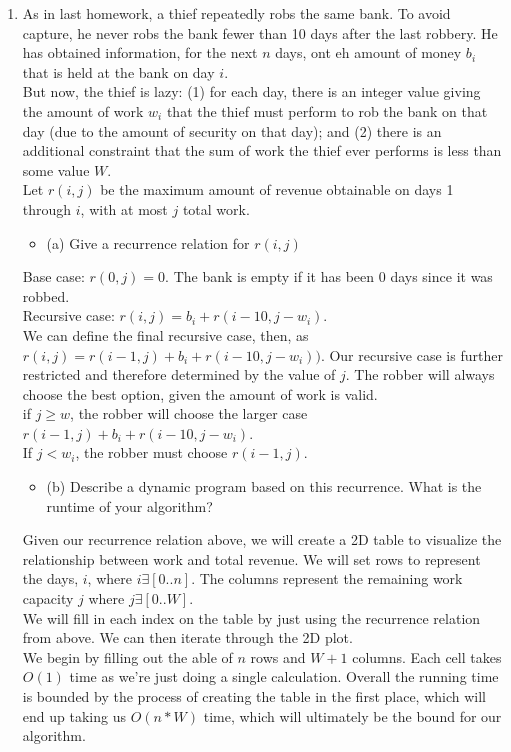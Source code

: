 \documentclass{article}
\begin{document}
\begin{enumerate}
\newpage
\item As in last homework, a thief repeatedly robs the same bank. To avoid capture, he never robs the bank fewer than 10 days after the last robbery. He has obtained information, for the next $n$ days, ont eh amount of money $b_i$ that is held at the bank on day $i$. \\
But now, the thief is lazy: (1) for each day, there is an integer value giving the amount of work $w_i$ that the thief must perform to rob the bank on that day (due to the amount of security on that day); and (2) there is an additional constraint that the sum of work the thief ever performs is less than some value $W$. \\
Let $r(i,j)$ be the maximum amount of revenue obtainable on days 1 through $i$, with at most $j$ total work. 
\begin{itemize}
    \item (a) Give a recurrence relation for $r(i,j)$
\end{itemize}
Base case: $r(0,j) = 0$. The bank is empty if it has been $0$ days since it was robbed. \\
Recursive case: $r(i,j) = b_i + r(i-10, j-w_i)$. \\
\newline 
We can define the final recursive case, then, as $r(i,j) = r(i-1,j) + b_i + r(i-10, j-w_i))$. Our recursive case is further restricted and therefore determined by the value of $j$. The robber will always choose the best option, given the amount of work is valid. \\
\newline 
if $j \geq w$, the robber will choose the larger case $r(i-1,j) + b_i + r(i-10, j-w_i)$. \\
If $j < w_i$, the robber must choose $r(i-1,j)$.








\begin{itemize}
    \item (b) Describe a dynamic program based on this recurrence. What is the runtime of your algorithm?
\end{itemize}
Given our recurrence relation above, we will create a 2D table to visualize the relationship between work and total revenue. We will set rows to represent the days, $i$, where $i \exists [0..n]$. The columns represent the remaining work capacity $j$ where $j \exists [0..W]$. \\
We will fill in each index on the table by just using the recurrence relation from above. We can then iterate through the 2D plot. \\
\newline 
We begin by filling out the able of $n$ rows and $W+1$ columns. Each cell takes $O(1)$ time as we're just doing a single calculation. Overall the running time is bounded by the process of creating the table in the first place, which will end up taking us $O(n*W)$ time, which will ultimately be the bound for our algorithm. 









\end{enumerate}
\end{document}
